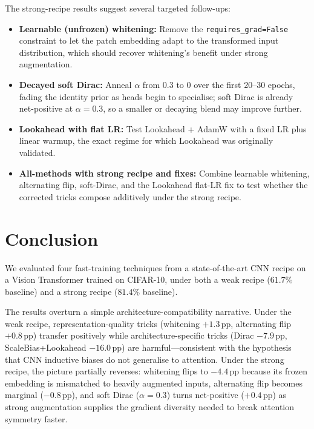 \documentclass[10pt,twocolumn]{article}
\newcommand{\cifar}{CIFAR-10}
\newcommand{\pp}{\,pp}   %
\begin{document}
The strong-recipe results suggest several targeted follow-ups:
\begin{itemize}[leftmargin=*, topsep=2pt, itemsep=1pt]
    \item \textbf{Learnable (unfrozen) whitening:} Remove the \texttt{requires\_grad=False} constraint to let the patch embedding adapt to the transformed input distribution, which should recover whitening's benefit under strong augmentation.
    \item \textbf{Decayed soft Dirac:} Anneal $\alpha$ from 0.3 to 0 over the first 20--30 epochs, fading the identity prior as heads begin to specialise; soft Dirac is already net-positive at $\alpha{=}0.3$, so a smaller or decaying blend may improve further.
    \item \textbf{Lookahead with flat LR:} Test Lookahead + AdamW with a fixed LR plus linear warmup, the exact regime for which Lookahead was originally validated.
    \item \textbf{All-methods with strong recipe and fixes:} Combine learnable whitening, alternating flip, soft-Dirac, and the Lookahead flat-LR fix to test whether the corrected tricks compose additively under the strong recipe.
\end{itemize}

\section{Conclusion}\label{sec:conclusion}

We evaluated four fast-training techniques from a state-of-the-art CNN recipe on a Vision Transformer trained on \cifar{}, under both a weak recipe ($61.7\%$ baseline) and a strong recipe ($81.4\%$ baseline).

The results overturn a simple architecture-compatibility narrative.
Under the weak recipe, representation-quality tricks (whitening $+1.3$\pp{}, alternating flip $+0.8$\pp{}) transfer positively while architecture-specific tricks (Dirac $-7.9$\pp{}, ScaleBias+Lookahead $-16.0$\pp{}) are harmful---consistent with the hypothesis that CNN inductive biases do not generalise to attention.
Under the strong recipe, the picture partially reverses: whitening flips to $-4.4$\pp{} because its frozen embedding is mismatched to heavily augmented inputs, alternating flip becomes marginal ($-0.8$\pp{}), and soft Dirac ($\alpha{=}0.3$) turns net-positive ($+0.4$\pp{}) as strong augmentation supplies the gradient diversity needed to break attention symmetry faster.
\end{document}
